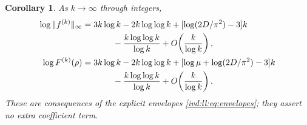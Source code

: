 \documentclass[11pt,letterpaper]{article}
\newtheorem{corollary}[theorem]{Corollary}
\theoremstyle{remark}\newtheorem{remark}[theorem]{Remark}
\numberwithin{equation}{section}
\begin{document}
\begin{corollary}\label{ivd:ll:cor:moments}
As $k\to\infty$ through integers,
\begin{align}
 \log\|f^{(k)}\|_\infty
 ={}&3k\log k-2k\log\log k
       +[\log(2D/\pi^2)-3]k\nonumber\\
 &\hspace{8mm}-\frac{k\log\log k}{\log k}
                     +O\!\left(\frac{k}{\log k}\right),
 \label{ivd:ll:eq:moment-refinement}\\
 \log F^{(k)}(\rho)
 ={}&3k\log k-2k\log\log k
       +[\log\mu+\log(2D/\pi^2)-3]k\nonumber\\
 &\hspace{8mm}-\frac{k\log\log k}{\log k}
                     +O\!\left(\frac{k}{\log k}\right).
 \label{ivd:ll:eq:radial-refinement}
\end{align}
These are consequences of the explicit envelopes
\eqref{ivd:ll:eq:envelopes}; they assert no extra coefficient term.
\end{corollary}
\end{document}
